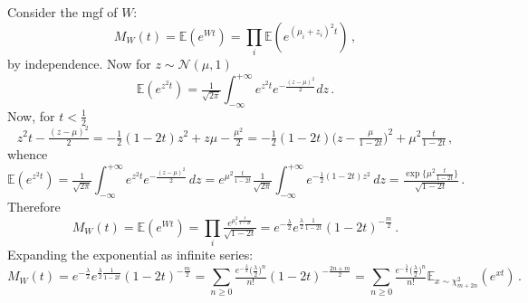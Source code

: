 \documentclass[a4paper,10pt]{article}
\begin{document}
Consider the mgf of $W$:
$$
M_W(t)
  = \mathbb{E}(e^{Wt})
  = \prod_i \mathbb{E}(e^{(\mu_i + z_i)^2 t})
  \,, $$
by independence. Now for $z \sim \mathcal{N}(\mu, 1)$
$$
\mathbb{E}(e^{z^2 t})
  = \tfrac1{\sqrt{2\pi}}
  \int_{-\infty}^{+\infty}
      e^{z^2 t} e^{-\tfrac{(z-\mu)^2}2}
  dz
  \,. $$
Now, for $t < \tfrac12$
$$
z^2 t - \tfrac{(z - \mu)^2}2
  = - \tfrac12 (1 - 2t) z^2 + z \mu - \tfrac{\mu^2}2
  = - \tfrac12 (1 - 2t) \bigl( z - \tfrac\mu{1 - 2t} \bigr)^2
    + \mu^2 \tfrac{t}{1 - 2t}
  \,, $$
whence
$$
\mathbb{E}(e^{z^2 t})
  = \tfrac1{\sqrt{2\pi}}
    \int_{-\infty}^{+\infty}
      e^{z^2 t} e^{-\tfrac{(z-\mu)^2}2}
    \, dz
  = e^{\mu^2 \tfrac{t}{1 - 2t}}
    \tfrac1{\sqrt{2\pi}}
    \int_{-\infty}^{+\infty}
      e^{- \tfrac12 (1 - 2t) z^2}
    \, dz
  = \tfrac{
      \exp{\{\mu^2 \tfrac{t}{1 - 2t}\}}
  }{\sqrt{1 - 2t}}
  \,. $$
Therefore
$$
M_W(t)
  = \mathbb{E}(e^{Wt})
  = \prod_i \tfrac{
      e^{\mu_i^2 \tfrac{t}{1 - 2t}}
    }{\sqrt{1 - 2t}}
  = e^{- \tfrac\lambda2} e^{\tfrac\lambda2 \tfrac1{1 - 2t}}
  (1 - 2t)^{-\tfrac{m}2}
  \,. $$
Expanding the exponential as infinite series:
$$
M_W(t)
  = e^{- \tfrac\lambda2} e^{\tfrac\lambda2 \tfrac1{1 - 2t}}
  (1 - 2t)^{-\tfrac{m}2}
  = \sum_{n \geq 0} \tfrac{e^{- \tfrac\lambda2} \bigl(\tfrac\lambda2\bigr)^n}{n!}
      (1 - 2t)^{-\tfrac{2n + m}2}
  = \sum_{n \geq 0} \tfrac{e^{- \tfrac\lambda2} \bigl(\tfrac\lambda2\bigr)^n}{n!}
      \mathbb{E}_{x \sim \chi^2_{m + 2n}}(e^{x t})
  \,. $$



\clearpage



\nocite{*}
\end{document}
